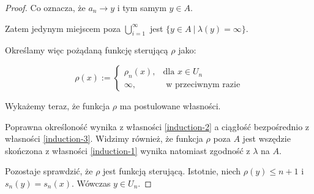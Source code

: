 \begin{thm}
\begin{proof}
  Co oznacza, że $a_n \rightarrow y$ i tym samym $y \in A$.
  
  Zatem jedynym miejscem poza $\bigcup_{i=1}^\infty$ jest $\{y \in A\ |\ \lambda(y) = \infty\}$.
  
  Określamy więc pożądaną funkcję sterującą $\rho$ jako:
  
  $$\rho(x) := 
    \begin{cases}
      \rho_n(x),&\mbox{dla } x \in U_n \\
      \infty,&\mbox{ w przeciwnym razie}
    \end{cases}
  $$
  
  Wykażemy teraz, że funkcja $\rho$ ma postulowane własności.
  
  Poprawna określoność wynika z własności \ref{induction-2} a ciągłość bezpośrednio z własności \ref{induction-3}. Widzimy również, że funkcja $\rho$ poza $A$ jest wszędzie skończona z własności \ref{induction-1} wynika natomiast zgodność z $\lambda$ na $A$.
  
  Pozostaje sprawdzić, że $\rho$ jest funkcją sterującą. Istotnie, niech $\rho(y) \leq n+1$ i $s_n(y) = s_n(x)$. Wówczas $y \in U_n$. 
\end{proof}
\end{thm}

